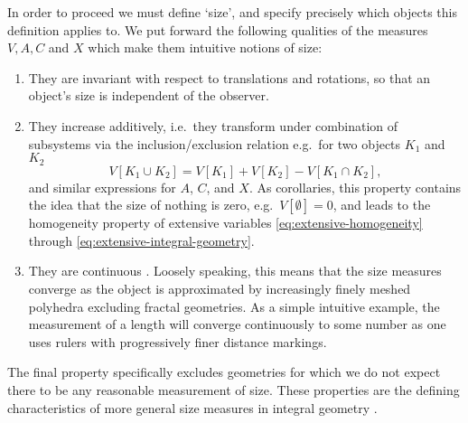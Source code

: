 In order to proceed we must define `size', and specify precisely which objects this definition applies to.
We put forward the following qualities of the measures $V, A, C$ and $X$ which make them intuitive notions of size:
\begin{enumerate}
\item They are invariant with respect to translations and rotations, so that an object's size is independent of the observer.
\item They increase additively, i.e.\ they transform under combination of subsystems via the inclusion/exclusion relation e.g.\ for two objects $K_1$ and $K_2$%
  \begin{equation}\label{eq:additivity}
    V[K_1 \cup K_2] = V[K_1] + V[K_2] - V[K_1 \cap K_2],
  \end{equation}
  and similar expressions for $A$, $C$, and $X$.
  As corollaries, this property contains the idea that the size of nothing is zero, e.g.\ $V[\emptyset] = 0$, and leads to the homogeneity property of extensive variables \eqref{eq:extensive-homogeneity} through \eqref{eq:extensive-integral-geometry}.
\item They are continuous%
  .
  Loosely speaking, this means that the size measures converge as the object is approximated by increasingly finely meshed polyhedra excluding fractal geometries.
  As a simple intuitive example, the measurement of a length will converge continuously to some number as one uses rulers with progressively finer distance markings.
\end{enumerate}
The final property specifically excludes geometries for which we do not expect there to be any reasonable measurement of size.
These properties are the defining characteristics of more general size measures in integral geometry \cite{Santalo2004, Klain1997}.




